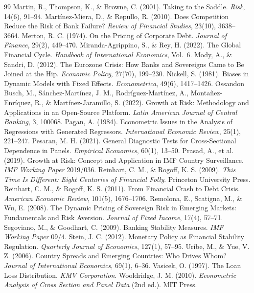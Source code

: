 \begin{thebibliography}{99}
 Martin, R., Thompson, K., \& Browne, C. (2001). Taking to the Saddle. \textit{Risk}, 14(6), 91--94.
 Martínez-Miera, D., \& Repullo, R. (2010). Does Competition Reduce the Risk of Bank Failure? \textit{Review of Financial Studies}, 23(10), 3638--3664.
 Merton, R. C. (1974). On the Pricing of Corporate Debt. \textit{Journal of Finance}, 29(2), 449--470.
 Miranda-Agrippino, S., \& Rey, H. (2022). The Global Financial Cycle. \textit{Handbook of International Economics}, Vol.\ 6.
 Mody, A., \& Sandri, D. (2012). The Eurozone Crisis: How Banks and Sovereigns Came to Be Joined at the Hip. \textit{Economic Policy}, 27(70), 199--230.
 Nickell, S. (1981). Biases in Dynamic Models with Fixed Effects. \textit{Econometrica}, 49(6), 1417--1426.
 Ossandon Busch, M., Sánchez-Martínez, J. M., Rodríguez-Martínez, A., Montañez-Enríquez, R., \& Martínez-Jaramillo, S. (2022). Growth at Risk: Methodology and Applications in an Open-Source Platform. \textit{Latin American Journal of Central Banking}, 3, 100068.
 Pagan, A. (1984). Econometric Issues in the Analysis of Regressions with Generated Regressors. \textit{International Economic Review}, 25(1), 221--247.
 Pesaran, M. H. (2021). General Diagnostic Tests for Cross-Sectional Dependence in Panels. \textit{Empirical Economics}, 60(1), 13--50.
 Prasad, A., et al. (2019). Growth at Risk: Concept and Application in IMF Country Surveillance. \textit{IMF Working Paper} 2019/036.
 Reinhart, C. M., \& Rogoff, K. S. (2009). \textit{This Time Is Different: Eight Centuries of Financial Folly}. Princeton University Press.
 Reinhart, C. M., \& Rogoff, K. S. (2011). From Financial Crash to Debt Crisis. \textit{American Economic Review}, 101(5), 1676--1706.
 Remolona, E., Scatigna, M., \& Wu, E. (2008). The Dynamic Pricing of Sovereign Risk in Emerging Markets: Fundamentals and Risk Aversion. \textit{Journal of Fixed Income}, 17(4), 57--71.
 Segoviano, M., \& Goodhart, C. (2009). Banking Stability Measures. \textit{IMF Working Paper} 09/4.
 Stein, J. C. (2012). Monetary Policy as Financial Stability Regulation. \textit{Quarterly Journal of Economics}, 127(1), 57--95.
 Uribe, M., \& Yue, V. Z. (2006). Country Spreads and Emerging Countries: Who Drives Whom? \textit{Journal of International Economics}, 69(1), 6--36.
 Vasicek, O. (1997). The Loan Loss Distribution. \textit{KMV Corporation}.
 Wooldridge, J. M. (2010). \textit{Econometric Analysis of Cross Section and Panel Data} (2nd ed.). MIT Press.
\end{thebibliography}
